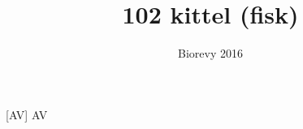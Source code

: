 \documentclass[a4paper,11pt]{article}
\title{102 kittel (fisk)}
\author{Biorevy 2016}
\begin{document}
\maketitle

\begin{roles}
    [AV] AV
\end{roles}

\begin{sketch}


\end{sketch}
\end{document}
